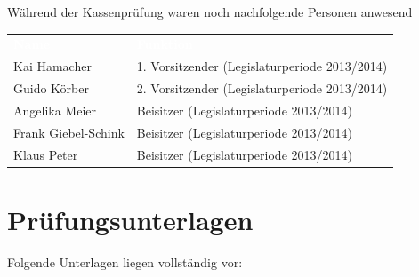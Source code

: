\documentclass[%
	titlepage,oneside,12pt,headlines=1.5,numbers=noenddot, chapterprefix=false,parskip=full-,DIV=14,pagesize]{scrreprt}
\renewcommand{\arraystretch}{1.2}%
\begin{document}
Während der Kassenprüfung waren noch nachfolgende Personen anwesend
\renewcommand{\arraystretch}{1.2}%
\setlength{\arrayrulewidth}{1.5pt}%
%
\begin{longtable}[ht]{|p{} p{}|}
\hline\rowcolor{pirateorange} 
	\textcolor{white}{\textbf{Name}} & \textcolor{white}{\textbf{Funktion}}  \\
        Kai Hamacher & 1. Vorsitzender (Legislaturperiode 2013/2014) \\ 
        Guido Körber & 2. Vorsitzender (Legislaturperiode 2013/2014) \\
        Angelika Meier & Beisitzer (Legislaturperiode 2013/2014) \\
        Frank Giebel-Schink & Beisitzer (Legislaturperiode 2013/2014) \\
        Klaus Peter & Beisitzer (Legislaturperiode 2013/2014) \\
\hline
\end{longtable}\vspace{-1.25em}


\chapter{Prüfungsunterlagen}
Folgende Unterlagen liegen vollständig vor:
\end{document}

